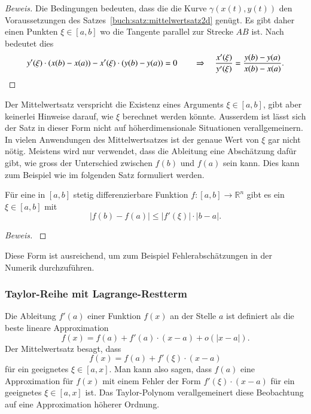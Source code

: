 \begin{proof}[Beweis]
Die Bedingungen bedeuten, dass die die Kurve $\gamma(x(t),y(t))$
den Voraussetzungen des Satzes~\ref{buch:satz:mittelwertsatz2d}
genügt.
Es gibt daher einen Punkten $\xi\in[a,b]$ wo die Tangente
parallel zur Strecke $AB$ ist.
Nach~\label{buch:polynome:eqn:mittelwertsatz2d} bedeutet dies
\[
y'(\xi) \cdot (x(b)-x(a))
-
x'(\xi) \cdot (y(b)-y(a))
=0
\qquad\Rightarrow\quad
\frac{x'(\xi)}{y'(\xi)}
=
\frac{y(b)-y(a)}{x(b)-x(a)}.
\qedhere
\]
\end{proof}

Der Mittelwertsatz verspricht die Existenz eines Arguments $\xi\in[a,b]$,
gibt aber keinerlei Hinweise darauf, wie $\xi$ berechnet werden könnte. 
Ausserdem ist lässt sich der Satz in dieser Form nicht auf höherdimensionale
Situationen verallgemeinern.
In vielen Anwendungen des Mittelwertsatzes ist der genaue Wert von $\xi$
gar nicht nötig.
Meistens wird nur verwendet, dass die Ableitung eine Abschätzung dafür
gibt, wie gross der Unterschied zwischen $f(b)$ und $f(a)$ sein kann.
Dies kann zum Beispiel wie im folgenden Satz formuliert werden.

\begin{satz}
Für eine in $[a,b]$ stetig differenzierbare Funktion
$f\colon [a,b]\to\mathbb R^n$ gibt es ein $\xi\in[a,b]$ mit
\[
|f(b)-f(a)| \le |f'(\xi)|\cdot |b-a|.
\]
\end{satz}

\begin{proof}[Beweis]
\cite[(8.5.1)]{buch:dieudonne}
\end{proof}

Diese Form ist ausreichend, um zum Beispiel Fehlerabschätzungen in der
Numerik durchzuführen.

\subsubsection{Taylor-Reihe mit Lagrange-Restterm}
Die Ableitung $f'(a)$ einer Funktion $f(x)$ an der Stelle $a$ ist definiert
als die beste lineare Approximation
\[
f(x) = f(a) + f'(a)\cdot (x-a) + o(|x-a|).
\]
Der Mittelwertsatz besagt, dass
\[
f(x) = f(a) + f'(\xi) \cdot (x-a)
\]
für ein geeignetes $\xi\in[a,x]$.
Man kann also sagen, dass $f(a)$ eine Approximation für $f(x)$ mit einem
Fehler der Form $f'(\xi)\cdot(x-a)$ für ein geeignetes $\xi\in[a,x]$ ist.
Das Taylor-Polynom verallgemeinert diese Beobachtung auf eine Approximation
höherer Ordnung.

